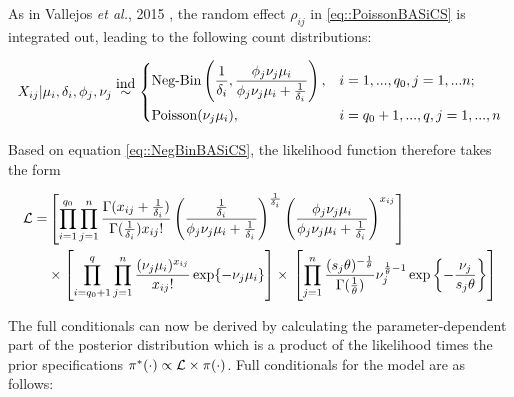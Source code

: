 As in Vallejos \emph{et al.}, 2015 \cite{Vallejos2015BASiCS}, the random effect $\rho_{ij}$ in \ref{eq::PoissonBASiCS} is integrated out, leading to the following count distributions:

\begin{equation} \label{eq::NegBinBASiCS}
 X_{ij}|\mu_i,\delta_i,\phi_j,\nu_j \stackrel{\mbox{ind}}{\sim}
 \left\lbrace
  \begin{aligned}
    &\text{Neg-Bin}\left(\frac{1}{\delta_i},\frac{\phi_j\nu_j\mu_i}{\phi_j\nu_j\mu_i+\frac{1}{\delta_i}}\right), && i=1,...,q_0,j=1,...n;  \\ 
    &\text{Poisson}(\nu_j\mu_i), && i=q_0+1,...,q,j=1,...,n        
  \end{aligned}
\right.
\end{equation}

Based on equation \eqref{eq::NegBinBASiCS}, the likelihood function therefore takes the form

\begin{align} \label{eq::loglik}
\mathcal{L} = & \left[\prod_{i=1}^{q_0}\prod_{j=1}^n\frac{\Gamma(x_{ij}+\frac{1}{\delta_i})}{\Gamma(\frac{1}{\delta_i})x_{ij}!}\left(\frac{\frac{1}{\delta_i}}{\phi_j\nu_j\mu_i+\frac{1}{\delta_i}}\right)^\frac{1}{\delta_i}\left(\frac{\phi_j\nu_j\mu_i}{\phi_j\nu_j\mu_i+\frac{1}{\delta_i}}\right)^{x_{ij}}\right] \nonumber\\ 
&\times\left[\prod_{i=q_0+1}^{q}\prod_{j=1}^n\frac{(\nu_j\mu_i)^{x_{ij}}}{x_{ij}!}\exp\lbrace-\nu_j\mu_i\rbrace\right]\times{}\left[\prod_{j=1}^n\frac{(s_j\theta)^{-\frac{1}{\theta}}}{\Gamma(\frac{1}{\theta})}\nu_j^{\frac{1}{\theta}-1}\exp\left\lbrace-\frac{\nu_j}{s_j\theta}\right\rbrace\right]
\end{align} 

\newpage

The full conditionals can now be derived by calculating the parameter-dependent part of the posterior distribution which is a product of the likelihood times the prior specifications $\pi^\ast(\cdot)\propto{}\mathcal{L}\times\pi(\cdot)$. 
Full conditionals for the model are as follows: \\

